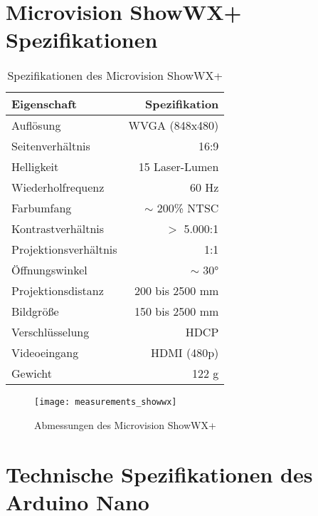\section{Microvision ShowWX+ Spezifikationen}
\label{app:projector}

\begin{table}[!ht]
\caption{Spezifikationen des Microvision ShowWX+}
\begin{center}
\vspace{-3mm}
\begin{tabular}{|l|r|}
\hline
\rowcolor{lightgray} Eigenschaft & Spezifikation \\
\hline
Auflösung 	& WVGA (848x480) \\
\hline
Seitenverhältnis & 16:9 \\
\hline
Helligkeit 	& 15 Laser-Lumen \\
\hline
Wiederholfrequenz & 60 Hz \\
\hline
Farbumfang 	& $\sim$ 200\% NTSC \\
\hline
Kontrastverhältnis 	& $>$ 5.000:1 \\
\hline
Projektionsverhältnis 	& 1:1 \\
\hline
Öffnungswinkel & $\sim$ 30°\\
\hline
Projektionsdistanz 	& 200 bis 2500 mm \\
\hline
Bildgröße 	& 150 bis 2500 mm \\
\hline
Verschlüsselung 	& HDCP \\
\hline
Videoeingang & HDMI (480p) \\
\hline
Gewicht 	& 122 g \\
\hline
\end{tabular}
\end{center}
\label{tab:landmarks_f1}
\end{table}

\begin{figure}[hb]
\begin{center}
		\texttt{[image: measurements\_showwx]}
\end{center}
\vspace{-5mm}
\caption{Abmessungen des Microvision ShowWX+}
\label{fig.specs_proj}
\end{figure}

\clearpage{}

\section{Technische Spezifikationen des Arduino Nano}
\label{app:arduino}

